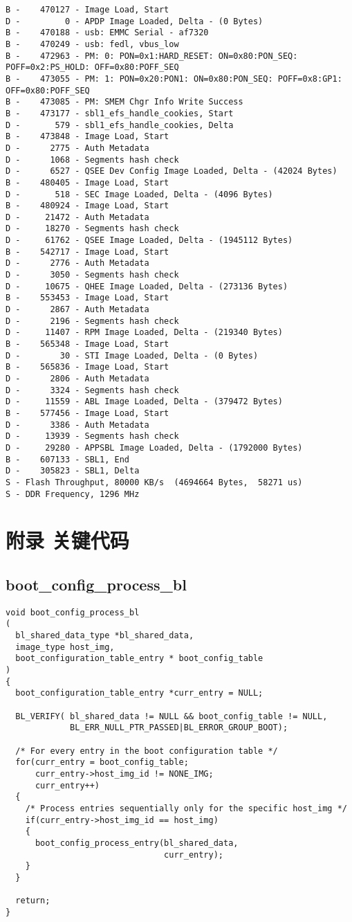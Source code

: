 \begin{lstlisting}
B -    470127 - Image Load, Start
D -         0 - APDP Image Loaded, Delta - (0 Bytes)
B -    470188 - usb: EMMC Serial - af7320
B -    470249 - usb: fedl, vbus_low
B -    472963 - PM: 0: PON=0x1:HARD_RESET: ON=0x80:PON_SEQ: POFF=0x2:PS_HOLD: OFF=0x80:POFF_SEQ
B -    473055 - PM: 1: PON=0x20:PON1: ON=0x80:PON_SEQ: POFF=0x8:GP1: OFF=0x80:POFF_SEQ
B -    473085 - PM: SMEM Chgr Info Write Success
B -    473177 - sbl1_efs_handle_cookies, Start
D -       579 - sbl1_efs_handle_cookies, Delta
B -    473848 - Image Load, Start
D -      2775 - Auth Metadata
D -      1068 - Segments hash check
D -      6527 - QSEE Dev Config Image Loaded, Delta - (42024 Bytes)
B -    480405 - Image Load, Start
D -       518 - SEC Image Loaded, Delta - (4096 Bytes)
B -    480924 - Image Load, Start
D -     21472 - Auth Metadata
D -     18270 - Segments hash check
D -     61762 - QSEE Image Loaded, Delta - (1945112 Bytes)
B -    542717 - Image Load, Start
D -      2776 - Auth Metadata
D -      3050 - Segments hash check
D -     10675 - QHEE Image Loaded, Delta - (273136 Bytes)
B -    553453 - Image Load, Start
D -      2867 - Auth Metadata
D -      2196 - Segments hash check
D -     11407 - RPM Image Loaded, Delta - (219340 Bytes)
B -    565348 - Image Load, Start
D -        30 - STI Image Loaded, Delta - (0 Bytes)
B -    565836 - Image Load, Start
D -      2806 - Auth Metadata
D -      3324 - Segments hash check
D -     11559 - ABL Image Loaded, Delta - (379472 Bytes)
B -    577456 - Image Load, Start
D -      3386 - Auth Metadata
D -     13939 - Segments hash check
D -     29280 - APPSBL Image Loaded, Delta - (1792000 Bytes)
B -    607133 - SBL1, End
D -    305823 - SBL1, Delta
S - Flash Throughput, 80000 KB/s  (4694664 Bytes,  58271 us)
S - DDR Frequency, 1296 MHz
\end{lstlisting}


\section{附录 关键代码}


\subsection{boot\_config\_process\_bl \label{boot_config_process_bl} }
\begin{lstlisting}
void boot_config_process_bl 
( 
  bl_shared_data_type *bl_shared_data, 
  image_type host_img, 
  boot_configuration_table_entry * boot_config_table 
)
{
  boot_configuration_table_entry *curr_entry = NULL;

  BL_VERIFY( bl_shared_data != NULL && boot_config_table != NULL,
             BL_ERR_NULL_PTR_PASSED|BL_ERROR_GROUP_BOOT);

  /* For every entry in the boot configuration table */
  for(curr_entry = boot_config_table;
      curr_entry->host_img_id != NONE_IMG;
      curr_entry++)
  {
    /* Process entries sequentially only for the specific host_img */
    if(curr_entry->host_img_id == host_img)
    {
      boot_config_process_entry(bl_shared_data,
                                curr_entry);
    }
  }
 
  return;
}
\end{lstlisting}
